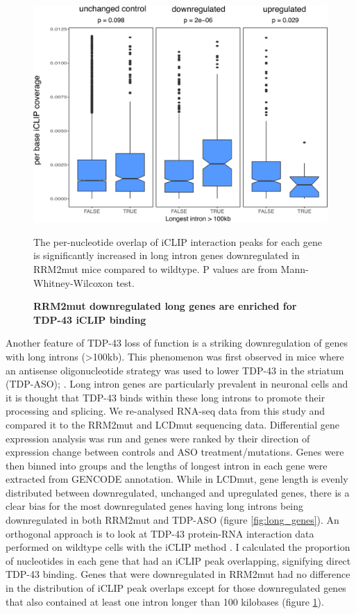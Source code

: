 \begin{figure}[h!]
	\begin{center}
		\includegraphics[width=14cm]{Figures/05_tdp_mice/long_genes_iclip.png}
	\end{center}
	\caption{\textbf{RRM2mut downregulated long genes are enriched for TDP-43 iCLIP binding}}
	The per-nucleotide overlap of iCLIP interaction peaks for each gene is significantly increased in long intron genes downregulated in RRM2mut mice compared to wildtype. P values are from Mann-Whitney-Wilcoxon test.
	\label{fig:long_genes_iclip}
\end{figure}



Another feature of TDP-43 loss of function is a striking downregulation of genes with long introns (>100kb). This phenomenon was first observed in mice where an antisense oligonucleotide strategy was used to lower TDP-43 in the striatum (TDP-ASO); \citep{Polymenidou2011-hs}. Long intron genes are particularly prevalent in neuronal cells and it is thought that TDP-43 binds within these long introns to promote their processing and splicing. We re-analysed RNA-seq data from this study and compared it to the RRM2mut and LCDmut sequencing data. Differential gene expression analysis was run and genes were ranked by their direction of expression change between controls and ASO treatment/mutations. Genes were then binned into groups and the lengths of longest intron in each gene were extracted from GENCODE annotation. While in LCDmut, gene length is evenly distributed between downregulated, unchanged and upregulated genes, there is a clear bias for the most downregulated genes having long introns being downregulated in both RRM2mut and TDP-ASO (figure \ref{fig:long_genes}). 
An orthogonal approach is to look at TDP-43 protein-RNA interaction data performed on wildtype cells with the iCLIP method \citep{Huppertz2014-ip}. I calculated the proportion of nucleotides in each gene that had an iCLIP peak overlapping, signifying direct TDP-43 binding. Genes that were downregulated in RRM2mut had no difference in the distribution of iCLIP peak overlaps except for those downregulated genes that also contained at least one intron longer than 100 kilobases (figure \ref{fig:long_genes_iclip}). 


